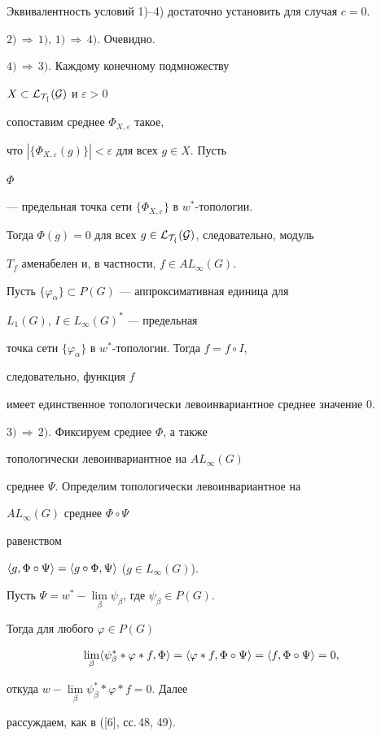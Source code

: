 \begin{pf}


Эквивалентность условий 1)--4) достаточно установить для случая $c=0$.





$2)\,\Longrightarrow\,1)$, $1)\,\Longrightarrow\,4)$. Очевидно.





$4)\,\Longrightarrow\,3)$. Каждому конечному подмножеству


$X\subset\cal L_{T_f}(G)$ и $\varepsilon>0$


сопоставим среднее $\Phi_{X,\varepsilon}$ такое,


что $|\{\Phi_{X,\varepsilon}(g)\}|<\varepsilon$ для всех $g\in X$. Пусть


$\Phi$


--- предельная точка сети $\{\Phi_{X,\varepsilon}\}$ в $w^*$-топологии.


Тогда $\Phi(g)=0$ для всех $g\in\cal L_{T_f}(G)$, следовательно, модуль


$T_f$ аменабелен и, в частности, $f\in AL_\infty(G)$.





Пусть $\{\varphi_\alpha\}\subset P(G)$ --- аппроксимативная единица для


$L_1(G)$, $I\in L_\infty(G)^*$ --- предельная


точка сети $\{\varphi_\alpha\}$ в $w^*$-топологии. Тогда $f=f\circ I$,


следовательно, функция $f$


имеет единственное топологически левоинвариантное среднее значение $0$.





$3)\,\Longrightarrow\,2)$. Фиксируем среднее $\Phi$, а также


топологически левоинвариантное на $AL_\infty(G)$


среднее $\Psi$. Определим топологически левоинвариантное на


$AL_\infty(G)$ среднее $\Phi\circ\Psi$


равенством


$\langle g,\Phi\circ\Psi\rangle=\langle g\circ\Phi,\Psi\rangle$ ($g\in L_\infty(G)$).


Пусть $\Psi=w^*-\lim\limits_\beta\psi_\beta$, где $\psi_\beta\in P(G)$.


Тогда для любого $\varphi\in P(G)$


$$


\lim_\beta\la\psi^*_\beta\ast\varphi\ast f,\Phi\ra=


\la\varphi\ast f,\Phi\circ\Psi\ra=


\la f,\Phi\circ\Psi\ra=0,


$$


откуда $w-\lim\limits_\beta\psi^*_\beta\ast\varphi\ast f=0$. Далее


рассуждаем, как в ([6], сс.\,48, 49).


\end{pf}





